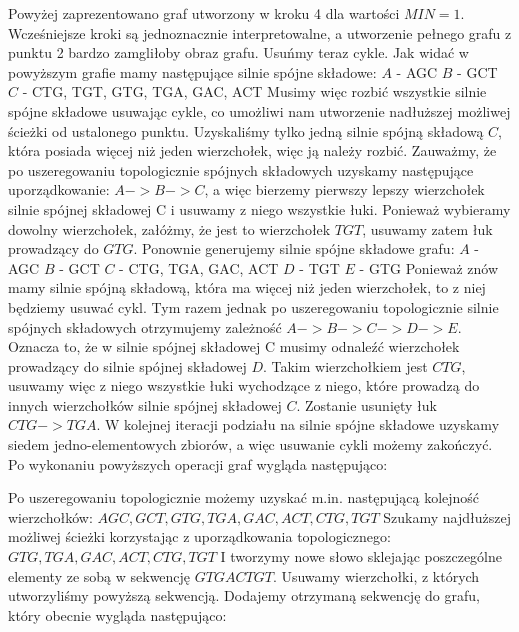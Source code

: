 \documentclass[a4paper,10pt]{article}
\begin{document}

Powyżej zaprezentowano graf utworzony w kroku 4 dla wartości $MIN=1$. Wcześniejsze kroki są jednoznacznie interpretowalne, a utworzenie pełnego grafu z punktu 2 bardzo zamgliłoby obraz grafu. Usuńmy teraz cykle.
Jak widać w powyższym grafie mamy następujące silnie spójne składowe:
$A$ - {AGC}
$B$ - {GCT}
$C$ - {CTG, TGT, GTG, TGA, GAC, ACT}
Musimy więc rozbić wszystkie silnie spójne składowe usuwając cykle, co umożliwi nam utworzenie nadłuższej możliwej ścieżki od ustalonego punktu.
Uzyskaliśmy tylko jedną silnie spójną składową $C$, która posiada więcej niż jeden wierzchołek, więc ją należy rozbić. Zauważmy, że po uszeregowaniu topologicznie spójnych składowych uzyskamy następujące uporządkowanie: $A->B->C$, a więc bierzemy pierwszy lepszy wierzchołek silnie spójnej składowej C i usuwamy z niego wszystkie łuki. Ponieważ wybieramy dowolny wierzchołek, załóżmy, że jest to wierzchołek $TGT$, usuwamy zatem łuk prowadzący do $GTG$.
Ponownie generujemy silnie spójne składowe grafu:
$A$ - {AGC}
$B$ - {GCT}
$C$ - {CTG, TGA, GAC, ACT}
$D$ - {TGT}
$E$ - {GTG}
Ponieważ znów mamy silnie spójną składową, która ma więcej niż jeden wierzchołek, to z niej będziemy usuwać cykl. Tym razem jednak po uszeregowaniu topologicznie silnie spójnych składowych otrzymujemy zależność $A->B->C->D->E$. Oznacza to, że w silnie spójnej składowej C musimy odnaleźć wierzchołek prowadzący do silnie spójnej składowej $D$. Takim wierzchołkiem jest $CTG$, usuwamy więc z niego wszystkie łuki wychodzące z niego, które prowadzą do innych wierzchołków silnie spójnej składowej $C$. Zostanie usunięty łuk $CTG->TGA$.
W kolejnej iteracji podziału na silnie spójne składowe uzyskamy siedem jedno-elementowych zbiorów, a więc usuwanie cykli możemy zakończyć. Po wykonaniu powyższych operacji graf wygląda następująco:


Po uszeregowaniu topologicznie możemy uzyskać m.in. następującą kolejność wierzchołków:
$AGC, GCT, GTG, TGA, GAC, ACT, CTG, TGT$
Szukamy najdłuższej możliwej ścieżki korzystając z uporządkowania topologicznego:
$GTG, TGA, GAC, ACT, CTG, TGT$
I tworzymy nowe słowo sklejając poszczególne elementy ze sobą w sekwencję $GTGACTGT$.
Usuwamy wierzchołki, z których utworzyliśmy powyższą sekwencją. Dodajemy otrzymaną sekwencję do grafu, który obecnie wygląda następująco:
\end{document}
